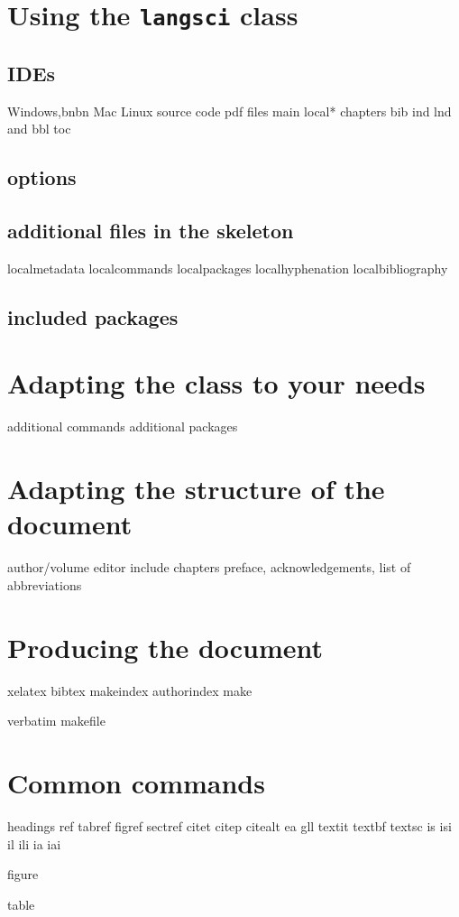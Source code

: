 \section{Using the \texttt{langsci} class}
\subsection{IDEs}
Windows,bnbn
Mac
Linux
source code pdf 
files
main
 local*
 chapters
 bib 
 ind 
 lnd 
 and 
 bbl 
 toc
\subsection{options}
\subsection{additional files in the skeleton}
localmetadata
localcommands
localpackages
localhyphenation
localbibliography

\subsection{included packages}

\section{Adapting the class to your needs}
additional commands
additional packages

\section{Adapting the structure of the document}
author/volume editor
include chapters
preface, acknowledgements, list of abbreviations

\section{Producing the document}
xelatex 
bibtex
makeindex
authorindex
make 

verbatim makefile

\section{Common commands}
headings
ref 
tabref
figref
sectref
citet citep citealt
ea gll 
textit textbf textsc
is isi il ili ia iai

figure

table 

